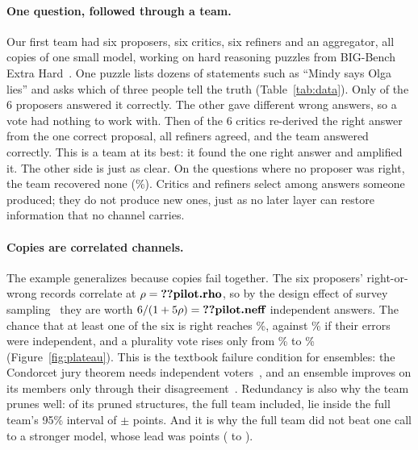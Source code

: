 \documentclass{article}
\begin{document}
\paragraph{One question, followed through a team.} Our first team had six proposers, six critics, six refiners and an
aggregator, all copies of one small model, working on hard reasoning puzzles from BIG-Bench Extra
Hard~\citep[BBEH;][]{kazemi2025bbeh}. One puzzle lists dozens of statements such as ``Mindy says Olga lies'' and asks
which of three people tell the truth (Table~\ref{tab:data}). Only  of the 6 proposers answered it
correctly. The other  gave  different wrong answers, so a vote had
nothing to work with. Then  of the 6 critics re-derived the right answer from the one correct
proposal, all  refiners agreed, and the team answered correctly. This is a team at its best: it
found the one right answer and amplified it. The other side is just as clear. On the  questions
where no proposer was right, the team recovered none (\%). Critics and refiners select among
answers someone produced; they do not produce new ones, just as no later layer can restore information that no channel
carries.

\paragraph{Copies are correlated channels.} The example generalizes because copies fail together. The six proposers'
right-or-wrong records correlate at $\rho = \nm{pilot.rho}$, so by the design effect of survey
sampling~\citep{kish1965} they are worth $6/(1+5\rho) = \nm{pilot.neff}$ independent answers. The chance that at least
one of the six is right reaches \%, against \% if their errors were
independent, and a plurality vote rises only from \% to \%
(Figure~\ref{fig:plateau}). This is the textbook failure condition for ensembles: the Condorcet jury theorem needs
independent voters~\citep{ladha1992}, and an ensemble improves on its members only through their
disagreement~\citep{krogh1995}. Redundancy is also why the team prunes well:  of its
 pruned structures, the full team included, lie inside the full team's 95\% interval of
$\pm$ points. And it is why the full team did not beat one call to a stronger model, whose lead was
 points ( to ).
\end{document}
